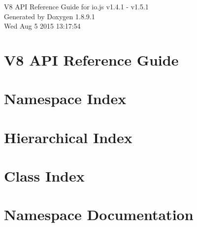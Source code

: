 \documentclass[twoside]{book}
\newcommand{\+}{\discretionary{\mbox{\scriptsize$\hookleftarrow$}}{}{}}
\newcommand{\clearemptydoublepage}{%
  \newpage{\pagestyle{empty}\cleardoublepage}%
}
\begin{document}
\hypersetup{pageanchor=false,
             bookmarks=true,
             bookmarksnumbered=true,
             pdfencoding=unicode
            }
\begin{titlepage}
\vspace*{7cm}
\begin{center}%
{\Large V8 A\+P\+I Reference Guide for io.\+js v1.4.1 -\/ v1.5.1 }\\
\vspace*{1cm}
{\large Generated by Doxygen 1.8.9.1}\\
\vspace*{0.5cm}
{\small Wed Aug 5 2015 13:17:54}\\
\end{center}
\end{titlepage}
\clearemptydoublepage
\tableofcontents
\clearemptydoublepage
{}
\hypersetup{pageanchor=true}

\chapter{V8 A\+P\+I Reference Guide}
\label{index}\hypertarget{index}{}
\chapter{Namespace Index}

\chapter{Hierarchical Index}

\chapter{Class Index}

\chapter{Namespace Documentation}

\end{document}
